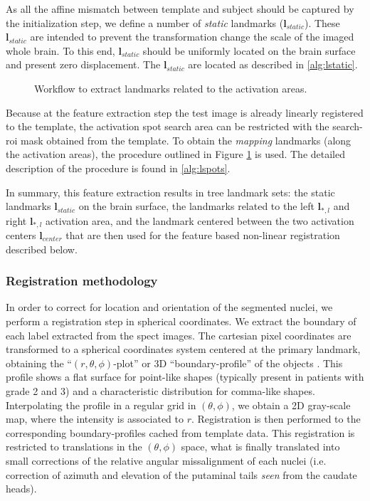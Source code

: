 \documentclass{frontiers}
\newcommand{\insertgraphic}[2]{}
\newcommand{\insertgraphic}[2]{\texttt{[image: \#2]}}
\newcommand{\lm}[1]{\ensuremath{\mathbf{l}_{#1}}}
\begin{document}
As all the affine mismatch between template and subject should be captured by the initialization
  step, we define a number of \emph{static} landmarks (\lm{static}).
These \lm{static} are intended to prevent the 
  transformation change the scale of the imaged whole brain.
To this end, \lm{static} should be uniformly located on the brain surface and present
  zero displacement. The \lm{static} are located as described in \autoref{alg:lstatic}.

\begin{figure}
\centering
\insertgraphic{width=0.75\linewidth}{figures/03-Segflow}
\caption{ \label{fig:featlmextract} Workflow to extract landmarks related to the activation areas. 
}
\end{figure}

Because at the feature extraction step the test image is already linearly registered to the template, 
  the activation spot search area can be restricted with the search-\gls*{roi} mask obtained from the template.
To obtain the \emph{mapping} landmarks (along the activation areas), the procedure
  outlined in Figure \ref{fig:featlmextract} is used.
The detailed description of the procedure is found in \autoref{alg:lspots}.

In summary, this feature extraction results in tree landmark sets: the static landmarks \lm{static} on the 
  brain surface, the landmarks related to the left \lm{*,l} and right \lm{*,l} activation area, 
  and the  landmark centered between the two activation centers \lm{center} that are then used for the 
  feature based non-linear registration described below.

\subsubsection{Registration methodology}
\label{sec:registration}
In order to correct for location and orientation of the segmented nuclei, we
  perform a registration step in spherical coordinates. We extract the boundary of
  each label extracted from the \gls*{spect} images. The cartesian pixel coordinates are
  transformed to a spherical coordinates system centered at the primary 
  landmark, obtaining the ``$(r,\theta,\phi)$-plot'' or 3D ``boundary-profile''
  of the objects \citep{davies_computer_2012}.
This profile shows a flat surface for point-like shapes (typically
  present in patients with grade 2 and 3) and a characteristic distribution for
  comma-like shapes. Interpolating the profile in a regular grid in $(\theta,\phi)$, 
  we obtain a 2D gray-scale map, where the intensity is associated to $r$.
Registration is then performed to the corresponding boundary-profiles cached from
  template data. This registration is restricted to translations in the
  $(\theta,\phi)$ space, what is finally translated into small corrections of
  the relative angular missalignment of each nuclei (i.e. correction of
  azimuth and elevation of the putaminal tails \emph{seen} from the caudate heads).
\end{document}
